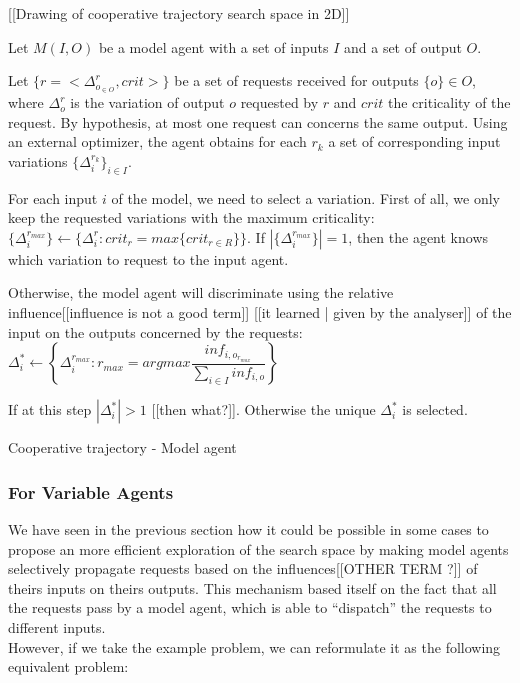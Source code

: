 [[Drawing of cooperative trajectory search space in 2D]]

Let $M(I,O)$ be a model agent with a set of inputs $I$ and a set of output $O$.

Let $\{r = <\Delta_{o_{\in O}}^{r}, crit>\}$ be a set of  requests received for outputs $\{o\} \in O$, where $\Delta_{o}^{r}$ is the variation of output $o$ requested by $r$ and $crit$ the criticality of the request. By hypothesis, at most one request can concerns the same output.
Using an external optimizer, the agent obtains for each $r_k$ a set of corresponding input variations $\{\Delta_i^{r_k}\}_{i \in I}$.

For each input $i$ of the model, we need to select a variation.
First of all, we only keep the requested variations with the maximum criticality:  $\{\Delta_i^{r_{max}}\} \leftarrow \{\Delta_i^r : crit_r = max \{crit_{r \in R}\}\}$.
If $|\{\Delta_i^{r_{max}}\}| =  1$, then the agent knows which variation to request to the input agent.

Otherwise, the model agent will discriminate using the relative influence[[influence is not a good term]] [[it learned | given by the analyser]] of the input on the outputs concerned by the requests: 
$\Delta_i^* \leftarrow \left\{ \Delta_i^{r_{max}} : r_{max} = argmax \dfrac{inf_{i,o_{r_{max}}}}{\displaystyle\sum_{i \in I} inf_{i,o}} \right\}$

If at this step $|\Delta_i^*| >1$ [[then what?]]. Otherwise the unique $\Delta_i^*$ is selected.

\begin{algorithm}
\caption{Cooperative trajectory - Model agent}
\label{algo_cooperative_trajectory_model}


\end{algorithm}

\subsubsection{For Variable Agents}

We have seen in the previous section how it could be possible in some cases to propose an more efficient exploration of the search space by making model agents selectively propagate requests based on the influences[[OTHER TERM ?]] of theirs inputs on theirs outputs. This mechanism based itself on the fact that all the requests pass by a model agent, which is able to \enquote{dispatch} the requests to different inputs.\\
However, if we take the example problem, we can reformulate it as the following equivalent problem:

